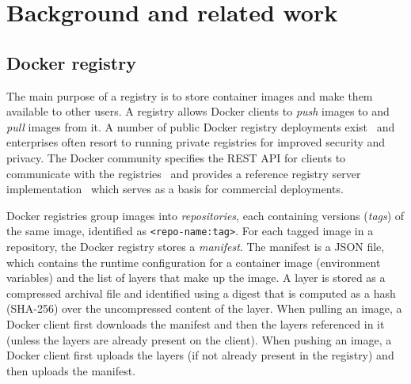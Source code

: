 \section{Background and related work}
\label{sec:background}

\subsection{Docker registry}

%
%

%
The main purpose of a registry is to store container images and make them available
to other users.
%
A registry allows Docker clients to \emph{push} images to and \emph{pull}
images from it.
%
A number of public Docker registry deployments
exist~\cite{docker-hub,amazon-ecr,jfrog-artifactory,azure-cr,google-cr} and
enterprises often resort to running private registries for improved security
and privacy.
%
The Docker community specifies the REST API for clients to communicate with the
registries~\cite{docker-registry-api} and provides a reference registry server implementation~\cite{docker-registry-software} which serves as
a basis for commercial deployments.


Docker registries group images into \emph{repositories}, each containing
versions (\emph{tags}) of the same image, identified as
\texttt{<repo-name:tag>}.
%
For each tagged image in a repository, the Docker registry stores a \emph{manifest}.
%
The manifest is a JSON file, which contains the runtime configuration for a
container image (\eg environment variables) and the list of layers that make
up the image.
%
A layer is stored as a compressed archival file and identified using a digest that is computed as a hash (SHA-256) over
the uncompressed content of the layer.
%
When pulling an image, a Docker client first downloads the manifest and then the
layers referenced in it (unless the layers are already present on the client).
%
When pushing an image, a Docker client first uploads the layers (if not already present in
the registry) and then uploads the manifest.





